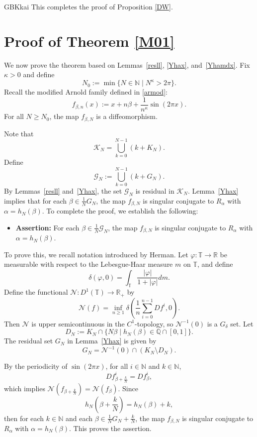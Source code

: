 \documentclass{amsart}
\theoremstyle{definition}
\begin{document}
\begin{CJK*}{GBK}{kai}
This completes the proof of Proposition \ref{DW}.
%		
	\vspace{1em}

		\section{\sc Proof of Theorem \ref{M01}}		

We now prove the theorem based on Lemmas~\ref{resll}, \ref{Yhax}, and~\ref{Yhamdx}. Fix $\kappa > 0$ and define
\begin{equation}\label{N_0}
N_0 := \min\{N \in \mathbb{N} \mid N^\kappa > 2\pi\}.
\end{equation}
Recall the modified Arnold family defined in \eqref{armod}:
\[
f_{\beta,n}(x) := x + n\beta + \frac{1}{n^{\kappa}} \sin(2\pi x).
\]
For all $N \geq N_0$, the map $f_{\beta,N}$ is a diffeomorphism.

Note that
\[
\mathcal{K}_N = \bigcup_{k=0}^{N-1} (k + K_N).
\]
Define
\[
\mathcal{G}_N := \bigcup_{k=0}^{N-1} (k + G_N).
\]
By Lemmas~\ref{resll} and~\ref{Yhax}, the set $\mathcal{G}_N$ is residual in $\mathcal{K}_N$.
Lemma~\ref{Yhax} implies that for each $\beta \in \frac{1}{N} G_N$, the map $f_{\beta,N}$ is singular conjugate to $R_\alpha$ with $\alpha = h_N(\beta)$. To complete the proof, we establish the following:

\begin{itemize}
\item \textbf{Assertion:} For each $\beta \in \frac{1}{N} \mathcal{G}_N$, the map $f_{\beta,N}$ is singular conjugate to $R_\alpha$ with $\alpha = h_N(\beta)$.
\end{itemize}

To prove this, we recall notation introduced by Herman. Let $\varphi : \mathbb{T} \to \mathbb{R}$ be measurable with respect to the Lebesgue-Haar measure $m$ on $\mathbb{T}$, and define
\[
\delta(\varphi, 0) = \int_{\mathbb{T}} \frac{|\varphi|}{1 + |\varphi|}  dm.
\]
Define the functional $\mathcal{N} : D^1(\mathbb{T}) \to \mathbb{R}_+$ by
\[
\mathcal{N}(f) = \inf_{n \geq 1} \delta\left( \frac{1}{n} \sum_{i=0}^{n-1} Df^i, 0 \right).
\]
Then $\mathcal{N}$ is upper semicontinuous in the $C^1$-topology, so $\mathcal{N}^{-1}(0)$ is a $G_\delta$ set. Let
\[
D_N := K_N \cap \{N\beta \mid h_N(\beta) \in \mathbb{Q} \cap [0,1]\}.
\]
The residual set $G_N$ in Lemma~\ref{Yhax} is given by
\[
G_N = \mathcal{N}^{-1}(0) \cap (K_N \setminus D_N).
\]

By the periodicity of $\sin(2\pi x)$, for all $i \in \mathbb{N}$ and $k \in \mathbb{N}$,
\[
Df_{\beta + \frac{k}{N}}^i = Df_{\beta}^i,
\]
which implies $\mathcal{N}(f_{\beta + \frac{k}{N}}) = \mathcal{N}(f_{\beta})$. Since
\[
h_N\left(\beta + \frac{k}{N}\right) = h_N(\beta) + k,
\]then for each $k \in \mathbb{N}$ and each $\beta \in \frac{1}{N} G_N + \frac{k}{N}$, the map $f_{\beta,N}$ is singular conjugate to $R_\alpha$ with $\alpha = h_N(\beta)$. This proves the assertion.


\end{CJK*}
\end{document}
